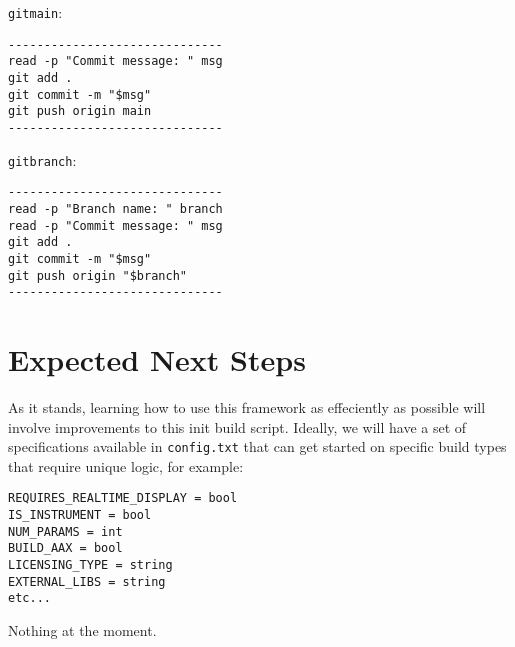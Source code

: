 \documentclass[twocolumn,natbib]{svjour3}        %
\begin{document}
\vspace{1em}

\texttt{gitmain}:
\begin{verbatim}
------------------------------
read -p "Commit message: " msg
git add .
git commit -m "$msg"
git push origin main
------------------------------
\end{verbatim}

\vspace{1em}

\texttt{gitbranch}:
\begin{verbatim}
------------------------------
read -p "Branch name: " branch
read -p "Commit message: " msg
git add .
git commit -m "$msg"
git push origin "$branch"
------------------------------
\end{verbatim}
\section{Expected Next Steps}
As it stands, learning how to use this framework as effeciently as possible will involve improvements to this init build script. Ideally, we will have a set of specifications available in \texttt{config.txt} that can get started on specific build types that require unique logic, for example:
\begin{verbatim}
REQUIRES_REALTIME_DISPLAY = bool
IS_INSTRUMENT = bool
NUM_PARAMS = int
BUILD_AAX = bool
LICENSING_TYPE = string
EXTERNAL_LIBS = string
etc...
\end{verbatim}




\phantom{.}

Nothing at the moment.
\end{document}
